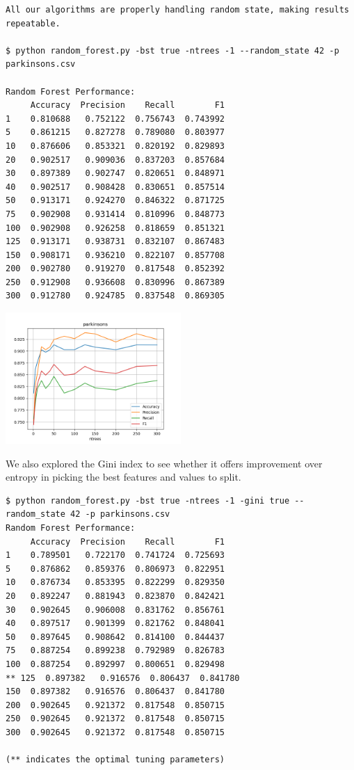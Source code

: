 \begin{verbatim}
All our algorithms are properly handling random state, making results repeatable.  

$ python random_forest.py -bst true -ntrees -1 --random_state 42 -p parkinsons.csv 

Random Forest Performance:
     Accuracy  Precision    Recall        F1
1    0.810688   0.752122  0.756743  0.743992
5    0.861215   0.827278  0.789080  0.803977
10   0.876606   0.853321  0.820192  0.829893
20   0.902517   0.909036  0.837203  0.857684
30   0.897389   0.902747  0.820651  0.848971
40   0.902517   0.908428  0.830651  0.857514
50   0.913171   0.924270  0.846322  0.871725
75   0.902908   0.931414  0.810996  0.848773
100  0.902908   0.926258  0.818659  0.851321
125  0.913171   0.938731  0.832107  0.867483
150  0.908171   0.936210  0.822107  0.857708
200  0.902780   0.919270  0.817548  0.852392
250  0.912908   0.936608  0.830996  0.867389
300  0.912780   0.924785  0.837548  0.869305

\end{verbatim}

\includegraphics[width=0.5\textwidth]{./figures/rf_parkinsons_entropy.png}


We also explored the Gini index to see whether it offers improvement over entropy in picking the best features and values to split.

\begin{verbatim}
$ python random_forest.py -bst true -ntrees -1 -gini true --random_state 42 -p parkinsons.csv
Random Forest Performance:
     Accuracy  Precision    Recall        F1
1    0.789501   0.722170  0.741724  0.725693
5    0.876862   0.859376  0.806973  0.822951
10   0.876734   0.853395  0.822299  0.829350
20   0.892247   0.881943  0.823870  0.842421
30   0.902645   0.906008  0.831762  0.856761
40   0.897517   0.901399  0.821762  0.848041
50   0.897645   0.908642  0.814100  0.844437
75   0.887254   0.899238  0.792989  0.826783
100  0.887254   0.892997  0.800651  0.829498
** 125  0.897382   0.916576  0.806437  0.841780
150  0.897382   0.916576  0.806437  0.841780
200  0.902645   0.921372  0.817548  0.850715
250  0.902645   0.921372  0.817548  0.850715
300  0.902645   0.921372  0.817548  0.850715

(** indicates the optimal tuning parameters)
\end{verbatim}

